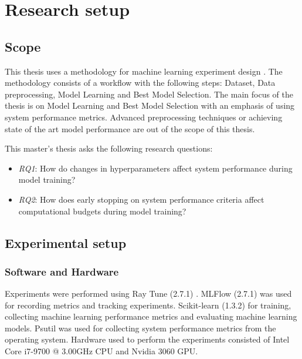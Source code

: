 \chapter{Research setup}
\label{chap:methods}

\section{Scope}

This thesis uses a methodology for machine learning experiment design \parencite{fernandez-lozanoMethodologyDesignExperiments2016}. The methodology consists of a workflow with the following steps: Dataset, Data preprocessing, Model Learning and Best Model Selection. The main focus of the thesis is on Model Learning and Best Model Selection with an emphasis of using system performance metrics. Advanced preprocessing techniques or achieving state of the art model performance are out of the scope of this thesis.





This master's thesis asks the following research questions:
\begin{itemize}
    \item \emph{RQ1}: How do changes in hyperparameters affect system performance during model training?
    \item \emph{RQ2}: How does early stopping on system performance criteria affect computational budgets during model training?
          
\end{itemize}

\section{Experimental setup}

\subsection{Software and Hardware}

Experiments were performed using Ray Tune (2.7.1) \parencite{liawTuneResearchPlatform2018}. MLFlow (2.7.1) \parencite{chenDevelopmentsMLflowSystem2020} was used for recording metrics and tracking experiments. Scikit-learn (1.3.2) \parencite{pedregosaScikitlearnMachineLearning2011} for training, collecting machine learning performance metrics and evaluating machine learning models. Psutil \parencite{rodolaGiampaoloPsutil2023} was used for collecting system performance metrics from the operating system. Hardware used to perform the experiments consisted of Intel Core i7-9700 @ 3.00GHz CPU and Nvidia 3060 GPU.

